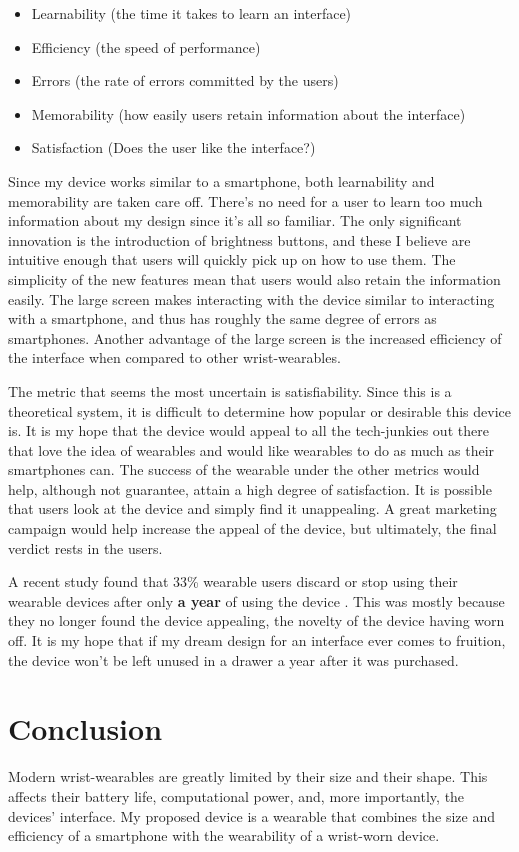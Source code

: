 \documentclass[11pt]{article}
\newcommand{\myreferences}{references}
\begin{document}
\begin{itemize}
  \item Learnability (the time it takes to learn an interface)
  \item Efficiency (the speed of performance)
  \item Errors (the rate of errors committed by the users)
  \item Memorability (how easily users retain information about the interface)
  \item Satisfaction (Does the user like the interface?)
\end{itemize} 
 
Since my device works similar to a smartphone, both learnability and memorability are taken care off. There's no need for a user to learn too much information about my design since it's all so familiar. The only significant innovation is the introduction of brightness buttons, and these I believe are intuitive enough that users will quickly pick up on how to use them. The simplicity of the new features mean that users would also retain the information easily. The large screen makes interacting with the device similar to interacting with a smartphone, and thus has roughly the same degree of errors as smartphones. Another advantage of the large screen is the increased efficiency of the interface when compared to other wrist-wearables. 

The metric that seems the most uncertain is satisfiability. Since this is a theoretical system, it is difficult to determine how popular or desirable this device is. It is my hope that the device would appeal to all the tech-junkies out there that love the idea of wearables and would like wearables to do as much as their smartphones can. The success of the wearable under the other metrics would help, although not guarantee, attain a high degree of satisfaction. It is possible that users look at the device and simply find it unappealing. A great marketing campaign would help increase the appeal of the device, but ultimately, the final verdict rests in the users. 

A recent study found that 33\% wearable users discard or stop using their wearable devices after only \textbf{a year} of using the device \cite{wearablesStopUse}. This was mostly because they no longer found the device appealing, the novelty of the device having worn off. It is my hope that if my dream design for an interface ever comes to fruition, the device won't be left unused in a drawer a year after it was purchased.

\section{Conclusion}

Modern wrist-wearables are greatly limited by their size and their shape. This affects their battery life, computational power, and, more importantly, the devices' interface. My proposed device is a wearable that combines the size and efficiency of a smartphone with the wearability of a wrist-worn device.



\end{document}
